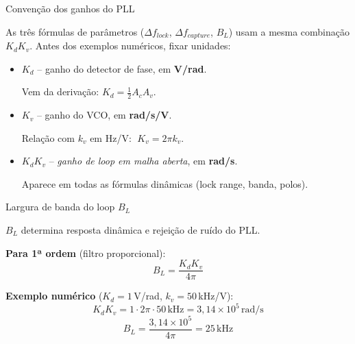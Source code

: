 
\begin{frame}{Convenção dos ganhos do PLL}

As três fórmulas de parâmetros ($\Delta f_{lock}$, $\Delta f_{capture}$, $B_L$) usam a mesma combinação $K_d K_v$. Antes dos exemplos numéricos, fixar unidades:

\pause
\vspace{0.3cm}
\begin{itemize}\itemsep0.3em
\item \textbf{$K_d$} -- ganho do detector de fase, em \textbf{V/rad}.

Vem da derivação: $K_d = \frac{1}{2}A_c A_v$.

\pause
\item \textbf{$K_v$} -- ganho do VCO, em \textbf{rad/s/V}.

Relação com $k_v$ em Hz/V: $\;K_v = 2\pi k_v$.

\pause
\item \textbf{$K_d K_v$} -- \emph{ganho de loop em malha aberta}, em \textbf{rad/s}.

Aparece em todas as fórmulas dinâmicas (lock range, banda, polos).
\end{itemize}

\end{frame}


\begin{frame}{Largura de banda do loop $B_L$}

\textbf{$B_L$} determina resposta dinâmica e rejeição de ruído do PLL.

\vspace{0.3cm}
\textbf{Para 1ª ordem} (filtro proporcional):
\[
\boxed{\;B_L = \frac{K_d K_v}{4\pi}\;}
\]

\pause
\vspace{0.3cm}
\textbf{Exemplo numérico} ($K_d = 1$\,V/rad, $k_v = 50$\,kHz/V):
\[
K_d K_v = 1 \cdot 2\pi \cdot 50\,\text{kHz} = 3{,}14\!\times\!10^5\,\text{rad/s}
\]
\[
B_L = \frac{3{,}14\!\times\!10^5}{4\pi} = 25\,\text{kHz}
\]

\end{frame}


